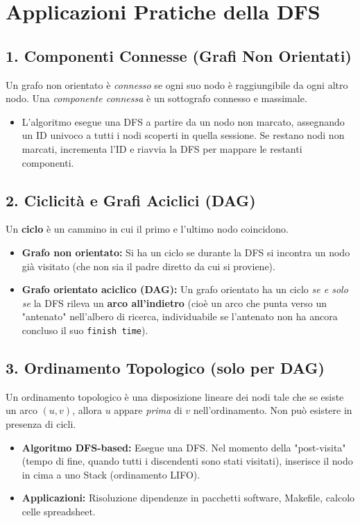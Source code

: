 \documentclass[12pt, a4paper]{article}
\begin{document}
\newpage

\section{Applicazioni Pratiche della DFS}

\subsection{1. Componenti Connesse (Grafi Non Orientati)}
Un grafo non orientato è \textit{connesso} se ogni suo nodo è raggiungibile da ogni altro nodo. Una \textit{componente connessa} è un sottografo connesso e massimale.
\begin{itemize}
\item L'algoritmo esegue una DFS a partire da un nodo non marcato, assegnando un ID univoco a tutti i nodi scoperti in quella sessione. Se restano nodi non marcati, incrementa l'ID e riavvia la DFS per mappare le restanti componenti.
\end{itemize}

\subsection{2. Ciclicità e Grafi Aciclici (DAG)}
Un \textbf{ciclo} è un cammino in cui il primo e l'ultimo nodo coincidono.
\begin{itemize}
\item \textbf{Grafo non orientato:} Si ha un ciclo se durante la DFS si incontra un nodo già visitato (che non sia il padre diretto da cui si proviene).
\item \textbf{Grafo orientato aciclico (DAG):} Un grafo orientato ha un ciclo \textit{se e solo se} la DFS rileva un \textbf{arco all'indietro} (cioè un arco che punta verso un "antenato" nell'albero di ricerca, individuabile se l'antenato non ha ancora concluso il suo \texttt{finish time}).
\end{itemize}

\subsection{3. Ordinamento Topologico (solo per DAG)}
Un ordinamento topologico è una disposizione lineare dei nodi tale che se esiste un arco $(u, v)$, allora $u$ appare \textit{prima} di $v$ nell'ordinamento. Non può esistere in presenza di cicli.
\begin{itemize}
\item \textbf{Algoritmo DFS-based:} Esegue una DFS. Nel momento della "post-visita" (tempo di fine, quando tutti i discendenti sono stati visitati), inserisce il nodo in cima a uno Stack (ordinamento LIFO).
\item \textbf{Applicazioni:} Risoluzione dipendenze in pacchetti software, Makefile, calcolo celle spreadsheet.
\end{itemize}
\end{document}
